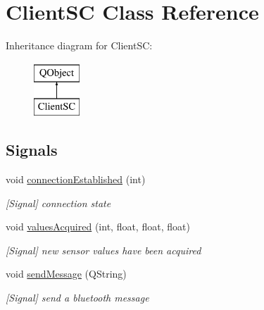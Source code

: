 \hypertarget{classClientSC}{}\section{Client\+SC Class Reference}
\label{classClientSC}
Inheritance diagram for Client\+SC\+:\begin{figure}[H]
\begin{center}
\leavevmode
\includegraphics[height=2.000000cm]{classClientSC}
\end{center}
\end{figure}
\subsection*{Signals}
\begin{DoxyCompactItemize}
\item 
void \hyperlink{classClientSC_a88166f0660ddf616b7e26fd5856d907e}{connection\+Established} (int)
\begin{DoxyCompactList}\small\item\em \mbox{[}Signal\mbox{]} connection state \end{DoxyCompactList}\item 
void \hyperlink{classClientSC_ace7df795354f0ddc5ecca1193b0e11b6}{values\+Acquired} (int, float, float, float)
\begin{DoxyCompactList}\small\item\em \mbox{[}Signal\mbox{]} new sensor values have been acquired \end{DoxyCompactList}\item 
void \hyperlink{classClientSC_a0d3a0a5d9496dd2c013a1c9b802dedcb}{send\+Message} (Q\+String)
\begin{DoxyCompactList}\small\item\em \mbox{[}Signal\mbox{]} send a bluetooth message \end{DoxyCompactList}\end{DoxyCompactItemize}
